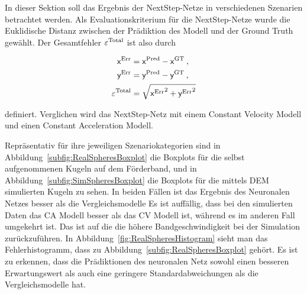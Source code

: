 



In dieser Sektion soll das Ergebnis der NextStep-Netze in verschiedenen Szenarien betrachtet werden.
Als Evaluationskriterium für die NextStep-Netze wurde die Euklidische Distanz zwischen der Prädiktion des Modell und der Ground Truth gewählt.
Der Gesamtfehler \(\varepsilon{^{\text{Total}}} \) ist also durch 

\begin{align*}
    \mathsf{x}{^{\text{Err}}} &=  \mathsf{x}{^{\text{Pred}}} -  \mathsf{x}{^{\text{GT}}} \: ,\\
    \mathsf{y}{^{\text{Err}}} &=  \mathsf{y}{^{\text{Pred}}} -  \mathsf{y}{^{\text{GT}}} \: ,\\
    \varepsilon{^{\text{Total}}} &= \sqrt{ \mathsf{x}{^{\text{Err}}}^2 +  \mathsf{y}{^{\text{Err}}}^2}
\end{align*}

definiert. Verglichen wird das NextStep-Netz mit einem Constant Velocity Modell und einen Constant Acceleration Modell.

Repräsentativ für ihre jeweiligen Szenariokategorien sind in Abbildung~\ref{subfig:RealSpheresBoxplot} die Boxplots für die selbst aufgenommenen Kugeln auf dem Förderband,
und in Abbildung~\ref{subfig:SimSpheresBoxplot} die Boxplots für die mittels DEM simulierten Kugeln zu sehen.
In beiden Fällen ist das Ergebnis des Neuronalen Netzes besser als die Vergleichsmodelle
Es ist auffällig, dass bei den simulierten Daten das CA Modell besser als das CV Modell ist, während es im anderen Fall umgekehrt ist.
Das ist auf die die höhere Bandgeschwindigkeit bei der Simulation zurückzuführen. 
In Abbildung~\ref{fig:RealSpheresHistogram} sieht man das Fehlerhistogramm, dass zu Abbildung~\ref{subfig:RealSpheresBoxplot} gehört.
Es ist zu erkennen, dass die Prädiktionen des neuronalen Netz sowohl einen besseren Erwartungswert als auch eine geringere Standardabweichungen als die Vergleichsmodelle hat.



